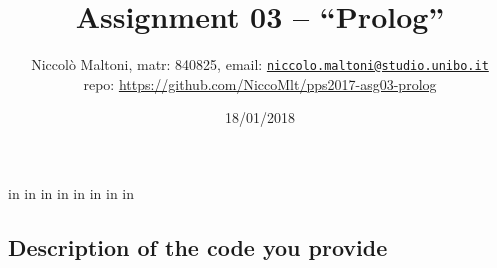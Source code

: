 in %
     in
     in      %
     in      %
     in
     in       %
     in
     in
    
\title{\vspace{-70pt}Assignment 03 -- ``Prolog''}
\author{Niccolò Maltoni, matr: 840825, email: {\href{mailto:niccolo.maltoni@studio.unibo.it}{\texttt{niccolo.maltoni@studio.unibo.it}}}\\ repo: {\url{https://github.com/NiccoMlt/pps2017-asg03-prolog}}}
\date{18/01/2018}




    \maketitle
    \vspace{-30pt}

    \subsection*{Description of the code you provide}

